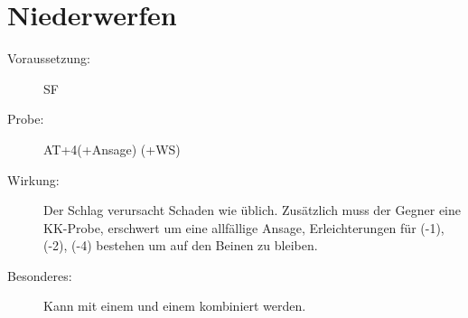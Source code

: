 \section{Niederwerfen}
\label{aktion.niederwerfen}
\begin{description}
    \item[Voraussetzung:]
        SF 
    \item[Probe:]
        AT+4(+Ansage) (+WS)
    \item[Wirkung:]
        Der Schlag verursacht Schaden wie üblich.
        Zusätzlich muss der Gegner eine KK-Probe, erschwert um eine allfällige Ansage, Erleichterungen für  (-1),  (-2),  (-4) bestehen um auf den Beinen zu bleiben.
    \item[Besonderes:]
        Kann mit einem  und einem  kombiniert werden.
\end{description}
